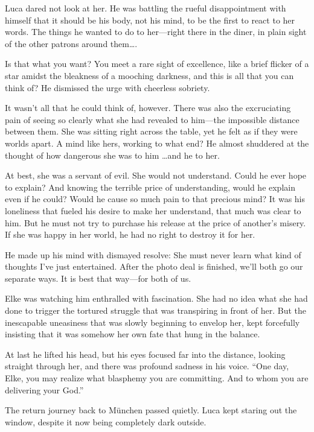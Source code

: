 Luca dared not look at her. He was battling the rueful disappointment with himself that it should be his body, not his mind, to be the first to react to her words. The things he wanted to do to her---right there in the diner, in plain sight of the other patrons around them\ldots.

Is that what you want? You meet a rare sight of excellence, like a brief flicker of a star amidst the bleakness of a mooching darkness, and this is all that you can think of? He dismissed the urge with cheerless sobriety.

It wasn't all that he could think of, however. There was also the excruciating pain of seeing so clearly what she had revealed to him---the impossible distance between them. She was sitting right across the table, yet he felt as if they were worlds apart. A mind like hers, working to what end? He almost shuddered at the thought of how dangerous she was to him \ldots and he to her.

At best, she was a servant of evil. She would not understand. Could he ever hope to explain? And knowing the terrible price of understanding, would he explain even if he could? Would he cause so much pain to that precious mind? It was his loneliness that fueled his desire to make her understand, that much was clear to him. But he must not try to purchase his release at the price of another's misery. If she was happy in her world, he had no right to destroy it for her.

He made up his mind with dismayed resolve: She must never learn what kind of thoughts I've just entertained. After the photo deal is finished, we'll both go our separate ways. It is best that way---for both of us.

Elke was watching him enthralled with fascination. She had no idea what she had done to trigger the tortured struggle that was transpiring in front of her. But the inescapable uneasiness that was slowly beginning to envelop her, kept forcefully insisting that it was somehow her own fate that hung in the balance.

At last he lifted his head, but his eyes focused far into the distance, looking straight through her, and there was profound sadness in his voice. ``One day, Elke, you may realize what blasphemy you are committing. And to whom you are delivering your God.''

\sectionline

The return journey back to München passed quietly. Luca kept staring out the window, despite it now being completely dark outside.

